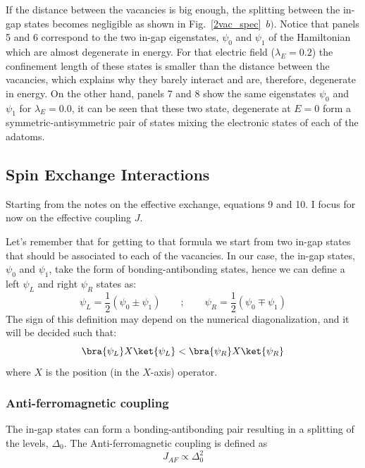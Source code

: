 If the distance between the vacancies is big enough, the splitting between the in-gap states becomes negligible as shown in Fig.~\ref{2vac_spec}~$b)$.
Notice that panels 5 and 6 correspond to the two in-gap eigenstates, $\psi_0$ and $\psi_1$ of the Hamiltonian which are almost degenerate in energy. For that electric field ($\lambda_E=0.2$) the confinement length of these states is smaller than the distance between the vacancies, which explains why they barely interact and are, therefore, degenerate in energy.
On the other hand, panels 7 and 8 show the same eigenstates $\psi_0$ and $\psi_1$ for $\lambda_E=0.0$, it can be seen that these two state, degenerate at $E=0$ form a symmetric-antisymmetric pair of states mixing the electronic states of each of the adatoms.


\subsection{Spin Exchange Interactions} %
Starting from the notes on the effective exchange, equations 9 and 10. I focus for now on the effective coupling $J$.

Let's remember that for getting to that formula we start from two in-gap states that should be associated to each of the vacancies.
In our case, the in-gap states, $\psi_0$ and $\psi_1$, take the form of bonding-antibonding states, hence we can define a left $\psi_L$ and right $\psi_R$ states as:
\begin{equation}
  \psi_L = \frac{1}{2}\left(\psi_0 \pm \psi_1\right) \quad\quad;\quad\quad
  \psi_R = \frac{1}{2}\left(\psi_0 \mp \psi_1\right)
\end{equation}
The sign of this definition may depend on the numerical diagonalization, and it will be decided such that:
\begin{equation*}
  \bra{\psi_L}X\ket{\psi_L} < \bra{\psi_R}X\ket{\psi_R}
\end{equation*}
where $X$ is the position (in the $X$-axis) operator.


\subsubsection{Anti-ferromagnetic coupling}
The in-gap states can form a bonding-antibonding pair resulting in a splitting of the levels, $\Delta_0$. The Anti-ferromagnetic coupling is defined as
\begin{equation}
  J_{AF} \propto \Delta^2_0     %
\end{equation}



